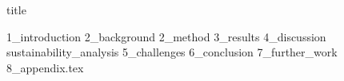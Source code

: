 \documentclass{article}
\begin{document}
{title}

\frontmatter

\tableofcontents


\mainmatter


{1_introduction}
{2_background}
{2_method}
{3_results}
{4_discussion}
{sustainability_analysis}
{5_challenges}
{6_conclusion}
{7_further_work}
{8_appendix.tex}
\newpage



\end{document}
